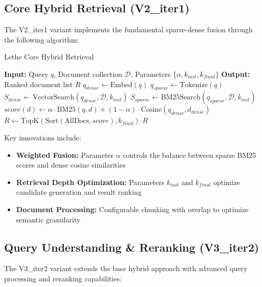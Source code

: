 \documentclass{neurips_2025}
\begin{document}
\subsection{Core Hybrid Retrieval (V2\_iter1)}

The V2\_iter1 variant implements the fundamental sparse-dense fusion through the following algorithm:

\begin{algorithm}
\caption{Lethe Core Hybrid Retrieval}
\begin{algorithmic}[1]
\STATE \textbf{Input:} Query $q$, Document collection $\mathcal{D}$, Parameters $\{\alpha, k_{init}, k_{final}\}$
\STATE \textbf{Output:} Ranked document list $R$
\STATE $q_{dense} \leftarrow \text{Embed}(q)$ 
\STATE $q_{sparse} \leftarrow \text{Tokenize}(q)$ 
\STATE $S_{dense} \leftarrow \text{VectorSearch}(q_{dense}, \mathcal{D}, k_{init})$ 
\STATE $S_{sparse} \leftarrow \text{BM25Search}(q_{sparse}, \mathcal{D}, k_{init})$
    \STATE $score(d) \leftarrow \alpha \cdot \text{BM25}(q, d) + (1-\alpha) \cdot \text{Cosine}(q_{dense}, d_{dense})$
\ENDFOR
\STATE $R \leftarrow \text{TopK}(\text{Sort}(\text{AllDocs}, score), k_{final})$
\RETURN $R$
\end{algorithmic}
\end{algorithm}

Key innovations include:
\begin{itemize}
\item \textbf{Weighted Fusion:} Parameter $\alpha$ controls the balance between sparse BM25 scores and dense cosine similarities
\item \textbf{Retrieval Depth Optimization:} Parameters $k_{init}$ and $k_{final}$ optimize candidate generation and result ranking
\item \textbf{Document Processing:} Configurable chunking with overlap to optimize semantic granularity
\end{itemize}

\subsection{Query Understanding \& Reranking (V3\_iter2)}

The V3\_iter2 variant extends the base hybrid approach with advanced query processing and reranking capabilities:
\end{document}
